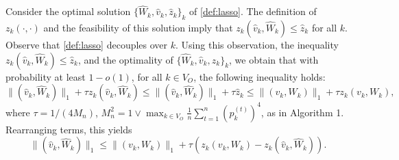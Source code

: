\documentclass[opre,nonblindrev]{informs3} %
\begin{document}
\begin{APPENDIX}{}
Consider the optimal solution  $\{\hat W_k, \hat v_k, \hat z_k\}_k$ of \eqref{def:lasso}.
The definition of $z_k(\cdot,\cdot)$ and the feasibility of this solution imply that
$ z_k(\hat v_k,\hat W_k)\leq \hat z_k$ for all $k$.
Observe that \eqref{def:lasso} decouples over $k$.
Using this observation, the inequality $ z_k(\hat v_k,\hat W_k)\leq \hat z_k$, and
the optimality of $\{\hat W_k, \hat v_k, \hat z_k\}_k$, we obtain that with probability at least $1-o(1)$, for all $k\in V_O$,
the following inequality holds:
\begin{equation}\label{eq:1NormTBound}
\|(\hat v_k,\hat W_k) \|_1 + \tau z_k(\hat v_k,\hat W_k) \leq  \|(\hat v_k,\hat W_k) \|_1 + \tau \hat z_k \leq \|(v_k,W_k)\|_1 + \tau z_k(v_k,W_k),
\end{equation}
where $\tau = 1/(4M_n)$,  $M_n^2= 1\vee \max_{k\in V_O}\frac{1}{n}\sum_{t=1}^n(p_k^{(t)})^4$, as in Algorithm 1.
Rearranging terms, this yields
\begin{equation}\label{eq:preTResult}
\|(\hat v_k,\hat W_k) \|_1    \leq \|(v_k,W_k)\|_1 + \tau \left( z_k(v_k,W_k) -  z_k(\hat v_k,\hat W_k) \right).
\end{equation}



\end{APPENDIX}
\end{document}
